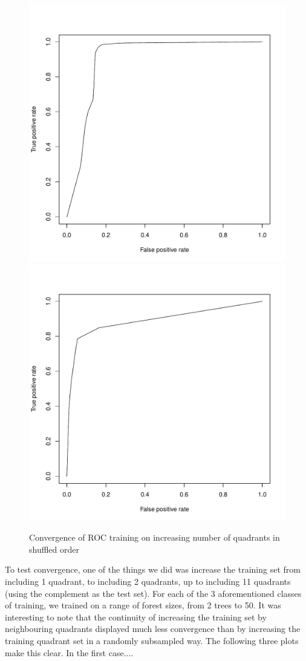 \documentclass{article}\usepackage[]{graphicx}\usepackage[]{color}
\begin{document}
  \begin{figure}[H]
  \includegraphics[width=\linewidth, height = 150pts ]{ROC_image4.pdf}
\endminipage\hfill
{}
  \includegraphics[width=\linewidth, height = 150pts]{ROC_image8.pdf}
\endminipage\hfill
  \caption{Convergence of ROC training on increasing number of quadrants in shuffled order}\label{}
\end{figure}


 To test convergence, one of the things we did was increase the training set from including 1 quadrant, to including 2 quadrants, up to including 11 quadrants (using the complement as the test set).  For each of the 3 aforementioned classes of training, we trained on a range of forest sizes, from 2 trees to 50. It was interesting to note that the continuity of increasing the training set by neighbouring quadrants displayed much less convergence than by increasing the training quadrant set in a randomly subsampled way.  The following three plots make this clear.  In the first case....\\
\end{document}
